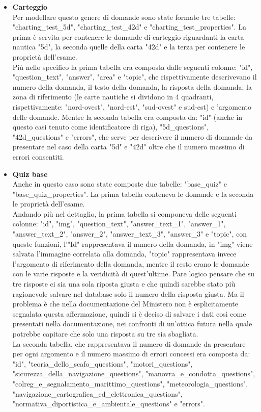 \begin{itemize}
	\item \textbf{Carteggio}\\
	Per modellare questo genere di domande sono state formate tre tabelle: "charting\_test\_5d", "charting\_test\_42d" e "charting\_test\_properties". La prima è servita per contenere  le domande di carteggio riguardanti la carta nautica "5d", la seconda quelle della carta "42d" e la terza per contenere le proprietà dell'esame.\\
	Più nello specifico la prima tabella era composta dalle seguenti colonne: "id", "question\_text", "answer", "area" e "topic", che rispettivamente descrivevano il numero della domanda, il testo della domanda, la risposta della domanda; la zona di riferimento (le carte nautiche si dividono in 4 quadranti, rispettivamente: "nord-ovest", "nord-est", "sud-ovest" e sud-est) e 'argomento delle domande.  Mentre la seconda tabella era composta da: "id" (anche in questo casi tenuto come identificatore di riga), "5d\_questions", "42d\_questions" e "errors", che serve per descrivere il numero di domande da presentare nel caso della carta "5d" e  "42d" oltre che il numero massimo di errori consentiti. \\
	
	\item \textbf{Quiz base}\\
	Anche in questo caso sono state composte due tabelle: "base\_quiz" e "base\_quiz\_properties".  La prima tabella conteneva le domande e la seconda le proprietà dell'esame.\\
	Andando più nel dettaglio, la prima tabella si componeva delle seguenti colonne: "id", "img",  "question\_text", "answer\_text\_1", "answer\_1", "answer\_text\_2", "answer\_2", "answer\_text\_3", "answer\_3" e "topic", con queste funzioni, l'"Id" rappresentava il numero della domanda, in "img" viene salvata l'immagine correlata alla domanda, "topic" rappresentava invece l'argomento di riferimento della domanda, mentre il resto erano le domande  con le varie risposte e la veridicità di quest'ultime. Pare logico pensare che su tre risposte ci sia una sola riposta giusta e che quindi sarebbe stato più ragionevole salvare nel database solo il numero della risposta giusta. Ma il problema è che nella documentazione del Ministero non è esplicitamente segnalata questa affermazione, quindi si è deciso di salvare i dati così come presentati nella documentazione, nei confronti di un'ottica futura nella quale potrebbe capitare che solo una risposta su tre sia sbagliata.\\
	La seconda tabella, che rappresentava il numero di domande da presentare per ogni argomento e il numero massimo di errori concessi era composta da: "id", "teoria\_dello\_scafo\_questions", "motori\_questions", "sicurezza\_della\_navigazione\_questions", "manovra\_e\_condotta\_questions", "colreg\_e\_segnalamento\_marittimo\_questions", "meteorologia\_questions", "navigazione\_cartografica\_ed\_elettronica\_questions", "normativa\_diportistica\_e\_ambientale\_questions" e  "errors".\\
	

\end{itemize}
